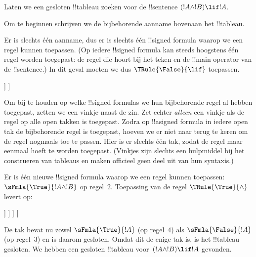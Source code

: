 \documentclass[../../../include/open-logic-section]{subfiles}
\begin{document}
      {}
      {}


\begin{ex}
Laten we een gesloten !!{tableau} zoeken voor de !!{sentence}
$(!A \land !B) \lif !A$.

Om te beginnen schrijven we de bijbehorende aanname bovenaan het
!!{tableau}.
\begin{oltableau}
  [\sFmla{\False}{(\formula{A} \land \formula{B}) \lif \formula{A}},
    just = \TAss]
\end{oltableau}

Er is slechts één aanname, dus er is slechts één !!{signed formula}
waarop we een regel kunnen toepassen. (Op iedere !!{signed formula} kan
steeds hoogstens één regel worden toegepast: de regel die hoort bij het
teken en de !!{main operator} van de !!{sentence}.) In dit geval moeten
we dus $\TRule{\False}{\lif}$ toepassen.
\begin{oltableau}
  [\sFmla{\False}{(\formula{A} \land \formula{B}) \lif \formula{A}},
    checked, just = \TAss
    [\sFmla{\True}{\formula{A} \land \formula{B}},
      just={\TRule{\False}{\lif}[1]}
      [\sFmla{\False}{\formula{A}}, just={\TRule{\False}{\lif}[1]}]
    ]
  ]
\end{oltableau}
Om bij te houden op welke !!{signed formula}s we hun bijbehorende regel
al hebben toegepast, zetten we een vinkje naast de zin. Zet echter
\emph{alleen} een vinkje als de regel op alle open takken is toegepast.
Zodra op !!a{signed formula} in iedere open tak de bijbehorende regel is
toegepast, hoeven we er niet naar terug te keren om de regel nogmaals toe
te passen. Hier is er slechts één tak, zodat de regel maar eenmaal hoeft
te worden toegepast. (Vinkjes zijn slechts een hulpmiddel bij het
construeren van tableaus en maken officieel geen deel uit van hun
syntaxis.)

Er is één nieuwe !!{signed formula} waarop we een regel kunnen toepassen:
$\sFmla{\True}{!A \land !B}$ op regel~$2$. Toepassing van de regel
$\TRule{\True}{\land}$ levert op:
\begin{oltableau}
  [\sFmla{\False}{(\formula{A} \land \formula{B}) \lif \formula{A}},
    checked, just = \TAss
    [\sFmla{\True}{\formula{A} \land \formula{B}},
      just={\TRule{\False}{\lif}[1]}, checked
      [\sFmla{\False}{\formula{A}}, just={\TRule{\False}{\lif}[1]}
        [\sFmla{\True}{\formula{A}}, just={\TRule{\True}{\land}[2]}
          [\sFmla{\True}{\formula{B}}, just={\TRule{\True}{\land}[2]}, close
          ]
        ]
      ]
    ]
  ]
\end{oltableau}
De tak bevat nu zowel $\sFmla{\True}{!A}$ (op regel~$4$) als
$\sFmla{\False}{!A}$ (op regel~$3$) en is daarom gesloten. Omdat dit de
enige tak is, is het !!{tableau} gesloten. We hebben een gesloten
!!{tableau} voor~$(!A \land !B) \lif !A$ gevonden.
\end{ex}
\end{document}
